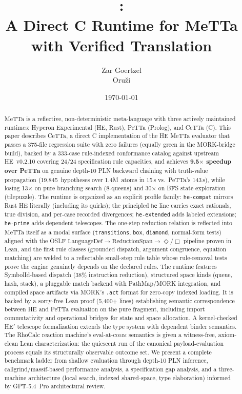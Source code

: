 \documentclass[11pt]{article}
\title{\CeTTa{}:\\
\large A Direct C Runtime for MeTTa with Verified Translation}
\author{Zar Goertzel\\Oru\v{z}i}
\date{\today}
\newcommand{\code}[1]{\texttt{#1}}
\newcommand{\PeTTa}{\textup{PeTTa}}
\newcommand{\HE}{\textup{HE}}
\newcommand{\CeTTa}{\textup{CeTTa}}
\newcommand{\RhoCalc}{\textup{RhoCalc}}
\begin{document}
\maketitle

\begin{abstract}
MeTTa is a reflective, non-deterministic meta-language with three
actively maintained runtimes: Hyperon Experimental (\HE{}, Rust),
\PeTTa{} (Prolog), and \CeTTa{} (C).  This paper describes \CeTTa{},
a direct C implementation of the \HE{} MeTTa evaluator that passes a
375-file regression suite with zero failures (equally green in the
MORK-bridge build), backed by a 333-case rule-indexed conformance
catalog against upstream \HE{}~v0.2.10 covering 24/24 specification
rule capacities, and achieves \textbf{9.5$\times$ speedup over
\PeTTa{}} on genuine depth-10 PLN backward chaining with truth-value
propagation (19{,}845~hypotheses over 1.4M~atoms in 15\,s vs.\
\PeTTa{}'s 143\,s), while losing 13$\times$ on pure branching search
(8-queens) and 30$\times$ on BFS state exploration (tilepuzzle).
The runtime is organized as an explicit profile family:
\code{he-compat} mirrors Rust \HE{} literally (including its quirks);
the principled \code{he} line carries exact rationals, true division,
and per-case recorded divergences; \code{he-extended} adds labeled
extensions; \code{he-prime} adds dependent telescopes.  The one-step
reduction relation is reflected into MeTTa itself as a modal surface
(\code{transitions}, \code{box}, \code{diamond}, normal-form tests)
aligned with the OSLF
$\mathrm{LanguageDef}\to\mathrm{ReductionSpan}\to\Diamond/\Box$
pipeline proven in Lean, and the first rule classes (grounded dispatch,
argument congruence, equation matching) are welded to a reflectable
small-step rule table whose rule-removal tests prove the engine
genuinely depends on the declared rules.
The runtime features SymbolId-based dispatch (38\% instruction
reduction), structured space kinds (queue, hash, stack), a pluggable
match backend with PathMap/MORK integration, and compiled space
artifacts via MORK's \code{.act} format for zero-copy indexed loading.
It is backed by a sorry-free Lean proof (5{,}400+ lines) establishing
semantic correspondence between \HE{} and \PeTTa{} evaluation on the
pure fragment, including import commutativity and operational bridges
for state and space allocation.  A kernel-checked HE$'$ telescope
formalization extends the type system with dependent binder semantics.
The \RhoCalc{} reaction machine's eval-at-\textsc{comm} semantics is given a
witness-free, axiom-clean Lean characterization: the quiescent run of the
canonical payload-evaluation process equals its structurally observable
outcome set.
We present a complete benchmark ladder from shallow evaluation through
depth-10 PLN inference, callgrind/massif-based performance analysis,
a specification gap analysis, and a three-machine architecture (local
search, indexed shared-space, type elaboration) informed by GPT-5.4~Pro
architectural review.
\end{abstract}
\end{document}

